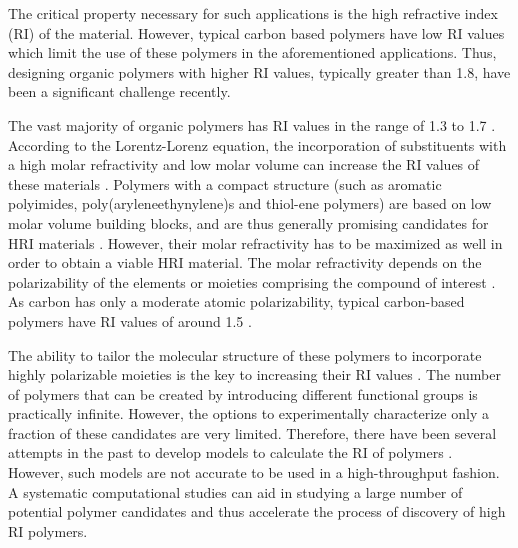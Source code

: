 The critical property necessary for such applications is the high refractive index (RI) of the material.  However, typical carbon based polymers have low RI values which limit the use of these polymers in the aforementioned applications. Thus, designing organic polymers with higher RI values, typically greater than 1.8, have been a significant challenge recently. 

The vast majority of organic polymers has RI values in the range of 1.3 to 1.7 \cite{Liu2009}. According to the Lorentz-Lorenz equation, the incorporation of substituents with a high molar refractivity and low molar volume can increase the RI values of these materials \cite{Yang1994}. Polymers with a compact structure (such as aromatic polyimides, poly(aryleneethynylene)s and thiol-ene polymers) are based on low molar volume building blocks, and are thus generally promising candidates for HRI materials \cite{Macdonald2014,Seesukphronrarak2007,Bhagat2012}. However, their molar refractivity has to be maximized as well in order to obtain a viable HRI material. The molar refractivity depends on the polarizability of the elements or moieties comprising the compound of interest \cite{Bhagat2012,Ma2016,Maheswara2010}. As carbon has only a moderate atomic polarizability, typical carbon-based polymers have RI values of around 1.5 \cite{Liu2008c}. 

The ability to tailor the molecular structure of these polymers to incorporate highly polarizable moieties is the key to increasing their RI values \cite{Liu2009,Javadi2013,Gazzo2016,Griebel2014}. The number of polymers that can be created by introducing different functional groups is practically infinite. However, the options to experimentally characterize only a fraction of these candidates are very limited. Therefore, there have been several attempts in the past to develop models to calculate the RI of polymers \cite{Alexandridis2012,Yu2007a,Holder2006,Lisa2010}. However, such models are not accurate to be used in a high-throughput fashion. A systematic computational studies can aid in studying a large number of potential polymer candidates and thus accelerate the process of discovery of high RI polymers. 

